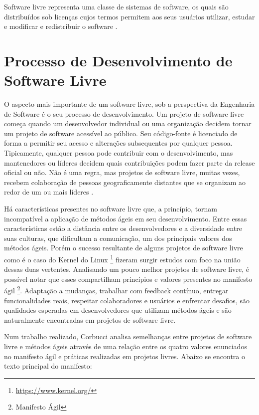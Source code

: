 Software livre representa uma classe de sistemas de software, os quais são distribuídos sob licenças cujos termos permitem aos seus usuários utilizar, estudar e modificar e redistribuir o software \cite{terceiro2012freesoftware}. 

\section{Processo de Desenvolvimento de Software Livre}

O aspecto mais importante de um software livre, sob a perspectiva da Engenharia de Software é o seu processo de desenvolvimento. Um projeto de software livre começa quando um desenvolvedor individual ou uma organização decidem tornar um projeto de software acessível ao público. Seu código-fonte é licenciado de forma a permitir seu acesso e alterações subsequentes por qualquer pessoa. Tipicamente, qualquer pessoa pode contribuir com o desenvolvimento, mas mantenedores ou líderes decidem quais contribuições podem fazer parte da release oficial ou não. Não é uma regra, mas projetos de software livre, muitas vezes, recebem colaboração de pessoas geograficamente distantes que se organizam ao redor de um ou mais líderes \cite{corbucci2011freemethods}. 

Há características presentes no software livre que, a princípio, tornam incompatível a aplicação de métodos ágeis em seu desenvolvimento. Entre essas características estão a distância entre os desenvolvedores e a diversidade entre suas culturas, que dificultam a comunicação, um dos principais valores dos métodos ágeis. Porém o sucesso resultante de alguns projetos de software livre como é o caso do Kernel do Linux \footnote{\url{https://www.kernel.org/}} fizeram surgir estudos com foco na união dessas duas vertentes. Analisando um pouco melhor projetos de software livre, é possível notar que esses compartilham princípios e valores presentes no manifesto ágil \footnote{Manifesto Ágil}. Adaptação a mudanças, trabalhar com feedback contínuo, entregar funcionalidades reais, respeitar colaboradores e usuários e enfrentar desafios, são qualidades esperadas em desenvolvedores que utilizam métodos ágeis e são naturalmente encontradas em projetos de software livre.

Num trabalho realizado, Corbucci \cite{corbucci2011freemethods} analisa semelhanças entre projetos de software livre e métodos ágeis através de uma relação entre os quatro valores enunciados no manifesto ágil e práticas realizadas em projetos livres. Abaixo se encontra o texto principal do manifesto:

